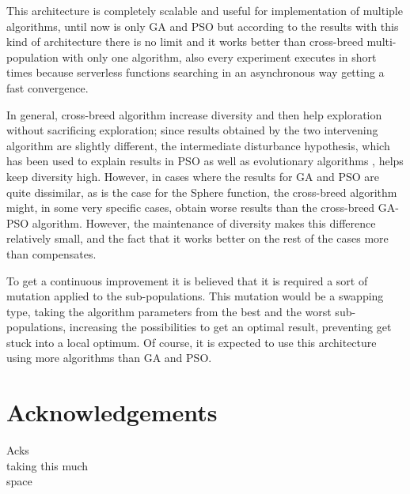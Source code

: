 \documentclass[runningheads]{llncs}
\begin{document}
This architecture is completely scalable and useful for implementation of
multiple algorithms, until now is only GA and PSO but according to the results
with this kind of architecture there is no limit and it works better than
cross-breed multi-population with only one algorithm, also every experiment executes in
short times because serverless functions searching in an asynchronous way
getting a fast convergence.

In general, cross-breed algorithm increase diversity and then help
exploration without sacrificing exploration; since results obtained by
the two intervening algorithm are slightly different, the intermediate
disturbance hypothesis, which has been used to explain results in PSO
\cite{gao2013particle} as well as evolutionary algorithms
\cite{merelo2008testing},  helps keep diversity high. However, in
cases 
where the results for GA and PSO are quite dissimilar, as is the case
for the Sphere function, the cross-breed algorithm might, in some very
specific cases, obtain worse results than the cross-breed  GA-PSO
algorithm. However, the maintenance of diversity makes this difference
relatively small, and the fact that it works better on the rest of the
cases more than compensates.




To get a continuous improvement it is believed that it is required a sort of
mutation applied to the sub-populations. This mutation would be a swapping type,
taking the algorithm parameters from the best and the worst sub-populations,
increasing the possibilities to get an optimal result, preventing get stuck into
a local optimum. Of course, it is expected to use this architecture using more
algorithms than GA and PSO.


\section*{Acknowledgements}

Acks\\
taking this much\\
space


      
  
\end{document}
